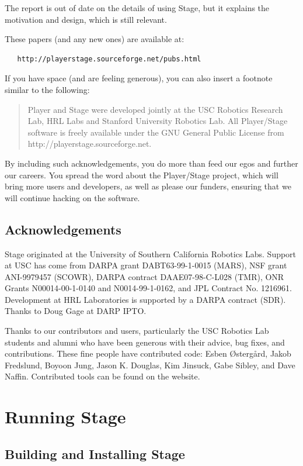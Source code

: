 \documentclass[11pt,twoside]{report}
\begin{document}
The report is out of date on the details of using Stage, but it
explains the motivation and design, which is still relevant.

These papers (and any new ones) are available at: 

\begin{verbatim}
   http://playerstage.sourceforge.net/pubs.html
\end{verbatim}

If you have space (and are feeling generous), you can also insert a footnote
similar to the following:
\begin{quote}
Player and Stage were developed jointly at the USC Robotics Research
Lab, HRL Labs and Stanford University Robotics Lab. All Player/Stage
software is freely available under the GNU General Public License from
http://playerstage.sourceforge.net.
\end{quote}
By including such acknowledgements, you do more than feed our egos and
further our careers.  You spread the word about the Player/Stage
project, which will bring more users and developers, as well as please
our funders, ensuring that we will continue hacking on the software.

  \section{Acknowledgements}

Stage originated at the University of Southern California Robotics
    Labs. Support at USC has come from DARPA grant DABT63-99-1-0015
    (MARS), NSF grant ANI-9979457 (SCOWR), DARPA contract
    DAAE07-98-C-L028 (TMR), ONR Grants N00014-00-1-0140 and
    N0014-99-1-0162, and JPL Contract No. 1216961. Development at HRL
    Laboratories is supported by a DARPA contract (SDR). Thanks to
    Doug Gage at DARP IPTO.

Thanks to our contributors and users, particularly the USC Robotics
Lab students and alumni who have been generous with their advice, bug
fixes, and contributions. These fine people have contributed code:
Esben \O{}sterg\aa{}rd, Jakob Fredslund, Boyoon Jung, Jason
K. Douglas, Kim Jinsuck, Gabe Sibley, and Dave Naffin. Contributed
tools can be found on the website.

\chapter{Running Stage}
  \section{Building and Installing Stage}
\end{document}
